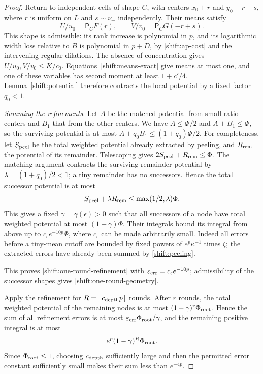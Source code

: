 \begin{proof}
Return to independent cells of shape $C$, with centers $x_0+r$
and $y_0-r+s$, where $r$ is uniform on $L$ and $s\sim\nu_+$
independently.  Their means satisfy
\[
 U/u_0=\mathsf P_CF(r),\qquad
 V/v_0=\mathsf P_CG(-r+s).
\]
This shape is admissible: its rank increase is polynomial in $p$,
and its logarithmic width loss relative to $B$ is polynomial in
$p+D$, by \eqref{shift:ap-cost} and the intervening regular dilations.
The absence of concentration gives
$U/u_0,V/v_0\leq K/c_0$.  Equations~\eqref{shift:means-exact}
give means at most one, and one of these variables has second
moment at least $1+c'/4$.
Lemma~\ref{shift:potential} therefore contracts the local potential
by a fixed factor $q_0<1$.

\emph{Summing the refinements.}
Let $A$ be the matched potential from small-ratio centers and $B_1$
that from the other centers.  We have $A\leq\Phi/2$ and
$A+B_1\leq\Phi$, so the surviving potential is at most
$A+q_0B_1\leq(1+q_0)\Phi/2$.
For completeness, let $S_{\rm peel}$ be the total weighted
potential already extracted by peeling, and $R_{\rm rem}$ the
potential of its remainder.  Telescoping gives
$2S_{\rm peel}+R_{\rm rem}\le\Phi$.  The matching argument
contracts the surviving remainder potential by
$\lambda=(1+q_0)/2<1$; a tiny remainder has no successors.
Hence the total successor potential is at most
\[
 S_{\rm peel}+\lambda R_{\rm rem}
 \le\max(1/2,\lambda)\Phi.
\]
This gives a fixed $\gamma=\gamma(\epsilon)>0$ such that all
successors of a node have total weighted potential at most
$(1-\gamma)\Phi$.
Their integrals bound its integral from above up to
$c_\epsilon e^{-10p}\Phi$, where $c_\epsilon$ can be made
arbitrarily small.  Indeed all errors before a tiny-mean cutoff
are bounded by fixed powers of $e^p\kappa^{-1}$ times $\zeta$;
the extracted errors have already been summed by
\eqref{shift:peeling}.

This proves \eqref{shift:one-round-refinement} with
$\varepsilon_{\rm err}=c_\epsilon e^{-10p}$; admissibility of the
successor shapes gives \eqref{shift:one-round-geometry}.

Apply the refinement for $R=\lceil c_{\rm depth}p\rceil$ rounds.
After $r$ rounds, the total weighted potential of the remaining nodes
is at most $(1-\gamma)^r\Phi_{\rm root}$. Hence the sum of all
refinement errors is at most
$\varepsilon_{\rm err}\Phi_{\rm root}/\gamma$, and the remaining
positive integral is at most
\[
                    e^p(1-\gamma)^R\Phi_{\rm root}.
\]
Since $\Phi_{\rm root}\le1$, choosing $c_{\rm depth}$ sufficiently
large and then the permitted error constant sufficiently small makes
their sum less than $e^{-4p}$.


\end{proof}

